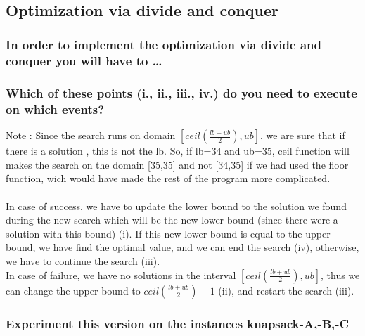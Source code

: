 \documentclass[a4paper ,12pt,french]{article}
\begin{document}
\newpage
\
\newpage

\subsection{Optimization via divide and conquer}

\subsubsection{In order to implement the optimization via divide and conquer you will have to \dots}

\subsubsection{Which of these points (i., ii., iii., iv.) do you need to execute on which events?}
Note : Since the search runs on domain $[ceil(\frac{lb + ub}{2}),ub]$, we are sure that if there is a solution , this is not the lb. So, if lb=34 and ub=35, ceil function will makes the search on the domain [35,35] and not [34,35] if we had used the floor function, wich would have made the rest of the program more complicated.\\\\

In case of success, we have to update the lower bound to the solution we found during the new search which will be the new lower bound (since there were a solution with this bound) (i). If this new lower bound is equal to the upper bound, we have find the optimal value, and we can end the search (iv), otherwise, we have to continue the search (iii).\\

In case of failure, we have no solutions in the interval $[ceil(\frac{lb + ub}{2}),ub]$, thus we can change the upper bound to $ceil(\frac{lb + ub}{2})-1$ (ii), and restart the search (iii).\\


\subsubsection{Experiment this version on the instances knapsack-A,-B,-C}
\end{document}
